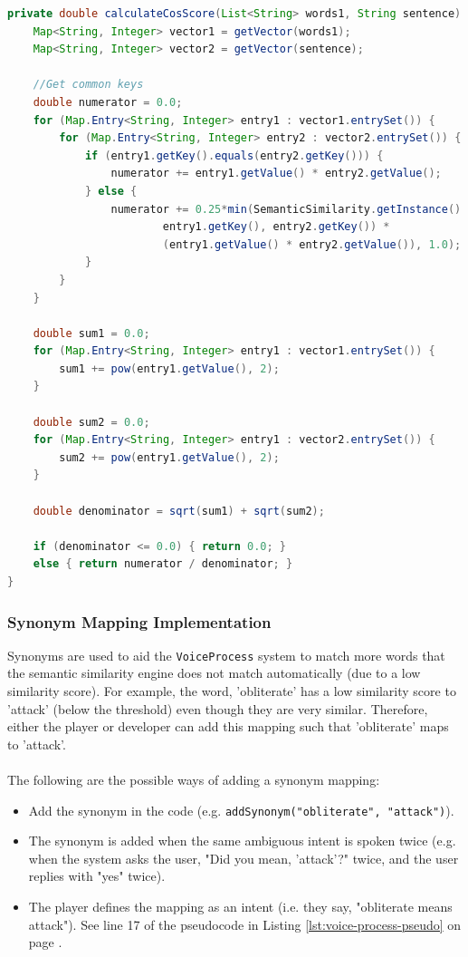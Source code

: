 \documentclass[12pt]{article}
\begin{document}
\begin{lstlisting}[language=Java, caption=SentenceMapper.calculateCosScore(), label=lst:cos-score]
private double calculateCosScore(List<String> words1, String sentence) {
    Map<String, Integer> vector1 = getVector(words1);
    Map<String, Integer> vector2 = getVector(sentence);

    //Get common keys
    double numerator = 0.0;
    for (Map.Entry<String, Integer> entry1 : vector1.entrySet()) {
        for (Map.Entry<String, Integer> entry2 : vector2.entrySet()) {
            if (entry1.getKey().equals(entry2.getKey())) {
                numerator += entry1.getValue() * entry2.getValue();
            } else {
                numerator += 0.25*min(SemanticSimilarity.getInstance().calculateScore(
                        entry1.getKey(), entry2.getKey()) *
                        (entry1.getValue() * entry2.getValue()), 1.0);
            }
        }
    }

    double sum1 = 0.0;
    for (Map.Entry<String, Integer> entry1 : vector1.entrySet()) {
        sum1 += pow(entry1.getValue(), 2);
    }

    double sum2 = 0.0;
    for (Map.Entry<String, Integer> entry1 : vector2.entrySet()) {
        sum2 += pow(entry1.getValue(), 2);
    }

    double denominator = sqrt(sum1) + sqrt(sum2);

    if (denominator <= 0.0) { return 0.0; }
    else { return numerator / denominator; }
}
\end{lstlisting}

\subsubsection{Synonym Mapping Implementation}

Synonyms are used to aid the \texttt{VoiceProcess} system to match more words that the semantic similarity engine does not match automatically (due to a low similarity score). For example, the word, 'obliterate' has a low similarity score to 'attack' (below the threshold) even though they are very similar. Therefore, either the player or developer can add this mapping such that 'obliterate' maps to 'attack'.
\\
\\
The following are the possible ways of adding a synonym mapping:

\begin{itemize}
\item Add the synonym in the code (e.g. \texttt{addSynonym("obliterate", "attack")}).

\item The synonym is added when the same ambiguous intent is spoken twice (e.g. when the system asks the user, "Did you mean, 'attack'?" twice, and the user replies with "yes" twice).

\item The player defines the mapping as an intent (i.e. they say, "obliterate means attack"). See line 17 of the pseudocode in Listing \ref{lst:voice-process-pseudo} on page \pageref{lst:voice-process-pseudo}.
\end{itemize}
\end{document}
